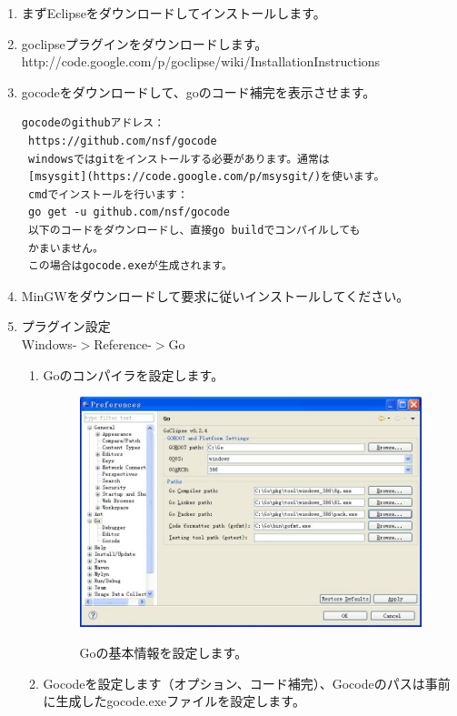 \begin{enumerate}
\item まずEclipseをダウンロードしてインストールします。
\item goclipseプラグインをダウンロードします。\\ http:\//\//code.google.com\//p\//goclipse\//wiki\//InstallationInstructions
\item gocodeをダウンロードして、goのコード補完を表示させます。
\begin{lstlisting}[numbers=none]
 gocodeのgithubアドレス：
 https://github.com/nsf/gocode
 windowsではgitをインストールする必要があります。通常は
 [msysgit](https://code.google.com/p/msysgit/)を使います。
 cmdでインストールを行います：
 go get -u github.com/nsf/gocode
 以下のコードをダウンロードし、直接go buildでコンパイルしても
 かまいません。
 この場合はgocode.exeが生成されます。
\end{lstlisting}
\item MinGWをダウンロードして要求に従いインストールしてください。
\item プラグイン設定\\ Windows-$>$Reference-$>$Go
  \begin{enumerate}
  \item Goのコンパイラを設定します。
\begin{figure}[H]
  \includegraphics[width=14cm]{1.4.eclipse2.png}
   \label{図1.12}
   \caption{Goの基本情報を設定します。}
\end{figure}
  \item Gocodeを設定します（オプション、コード補完）、Gocodeのパスは事前に生成したgocode.exeファイルを設定します。
\begin{figure}[H]

\end{figure}
\end{enumerate}
\end{enumerate}
